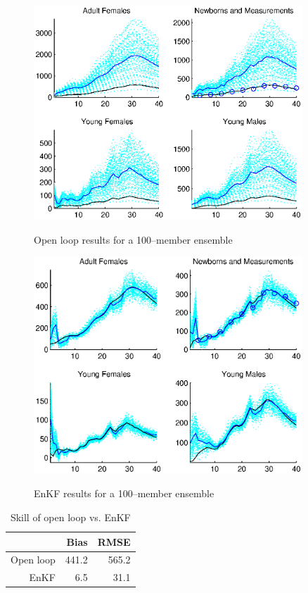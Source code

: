 \documentclass[fleqn, letterpaper]{article}
\numberwithin{figure}{section}
\begin{document}
\begin{figure}
\includegraphics[width=0.9\textwidth]{ropenloop}
\label{ol}
\caption{Open loop results for a 100--member ensemble}
\end{figure}
\begin{figure}
\includegraphics[width=0.9\textwidth]{kf}
\label{kf}
\caption{EnKF results for a 100--member ensemble}
\end{figure}
\begin{table}
\begin{tabular}{rrr}
& Bias & RMSE \\
\hline
Open loop & 441.2 & 565.2 \\
EnKF & 6.5 & 31.1
\end{tabular}
\label{initcomp}
\caption{Skill of open loop vs. EnKF}
\end{table}
\end{document}
